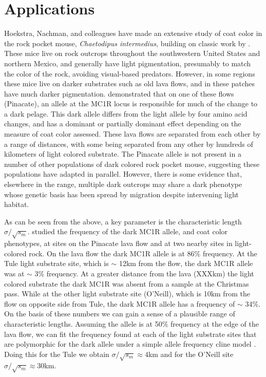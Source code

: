 \documentclass{article}
\begin{document}
\section{Applications} 
Hoekstra, Nachman, and colleagues have made an extensive study of coat color in the rock pocket mouse, \emph{Chaetodipus intermedius}, building on classic work by \citet{dice1940ecologic,benson1933concealing}. These mice live on rock outcrops throughout the southwestern United States and northern Mexico, 
and generally have light pigmentation, presumably to match the color of the rock, avoiding visual-based predators. 
However, in some regions these mice live on darker substrates such as old lava flows, 
and in these patches have much darker pigmentation. 
\citet{nachman2003different} demonstrated that on one of these flows (Pinacate), an allele at the MC1R locus is responsible for much of the change to a dark pelage.
This dark allele differs from the light allele by four amino acid changes, 
and has a dominant or partially dominant effect depending on the measure of coat color assessed. 
These lava flows are separated from each other by a range of distances, 
with some being separated from any other by hundreds of kilometers of light colored substrate. 
The Pinacate allele is not present in a number of other populations of dark colored rock pocket mouse, 
suggesting these populations have adapted in parallel. 
However, there is some evidence \citep{Hoekstra:05} that, elsewhere in the range, 
multiple dark outcrops may share a dark phenotype whose genetic basis has been spread by migration
despite intervening light habitat.

As can be seen from the above, a key parameter is the characteristic length $\sigma/\sqrt{s_m}$. 
\citep{Hoekstra:04} studied the frequency of the dark MC1R allele, and coat color phenotypes, at sites on the Pinacate lava flow and at two nearby sites in light-colored rock.
On the lava flow the dark MC1R allele is at 86\% frequency. 
At the Tule light substrate site, which is $\sim$ 12km from the flow, the dark MC1R allele was at $\sim$ 3\% frequency. 
At a greater distance from the lava (XXXkm) the light colored substrate the dark MC1R was absent from a sample at the Christmas pass. 
While at the other light substrate site (O'Neill), which is 10km from the flow on opposite side from Tule, 
the dark MC1R allele has a frequency of $\sim$ 34\%. 
On the basis of these numbers we can gain a sense of a plausible range of characteristic lengths.
Assuming the allele is at 50\% frequency at the edge of the lava flow, 
we can fit the frequency found at each of the light substrate sites that are 
polymorphic for the dark allele under a simple allele frequency cline model \citep{XXX}.
Doing this for the Tule we obtain $\sigma/\sqrt{s_m} \approx 4$km and for the O'Neill site
$\sigma/\sqrt{s_m} \approx 30$km. 
\end{document}
